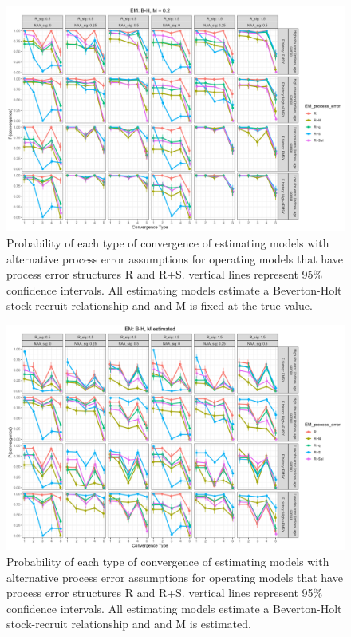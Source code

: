 \documentclass[
  12pt,
]{article}
\begin{document}
\begin{landscape}
\begin{figure}
\caption{Probability of each type of convergence of estimating models with alternative process error assumptions for operating models that have process error structures R and R+S. vertical lines represent 95\% confidence intervals. All estimating models estimate a Beverton-Holt stock-recruit relationship and and M is fixed at the true value.}\label{naa_om_em_BH_MF_convergence}
\begin{center}
\includegraphics[width = \textwidth]{naa_om_p_convergence_BH_M_fixed.png}
\end{center}
\end{figure}
\end{landscape}

\begin{landscape}
\begin{figure}
\caption{Probability of each type of convergence of estimating models with alternative process error assumptions for operating models that have process error structures R and R+S. vertical lines represent 95\% confidence intervals. All estimating models estimate a Beverton-Holt stock-recruit relationship and and M is estimated.}\label{naa_om_em_BH_ME_convergence}
\begin{center}
\includegraphics[width = \textwidth]{naa_om_p_convergence_BH_M_estimated.png}
\end{center}
\end{figure}
\end{landscape}
\end{document}
